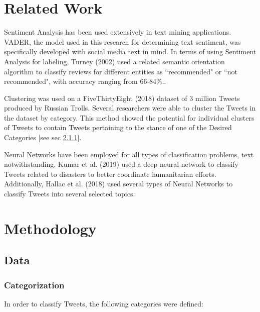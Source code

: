 \documentclass[12pt,letterpaper,oneside,titlepage]{article}
\begin{document}
\section{Related Work}\label{sec:related-work}

Sentiment Analysis has been used extensively in text mining applications. VADER, the model used in this 
research for determining text sentiment, was specifically developed with social media text in mind\cite{vader}. 
In terms of using Sentiment Analysis for labeling, Turney (2002) used a related semantic orientation algorithm to classify reviews for different entities as ``recommended" or ``not recommended", with accuracy ranging from 66-84\%.\cite{thumbs}.

Clustering was used on a FiveThirtyEight (2018) dataset of 3 million Tweets produced by Russian Trolls\cite{fte}. 
Several researchers were able to cluster the Tweets in the dataset by 
category. This method showed the potential for individual clusters of Tweets to contain Tweets 
pertaining to the stance of one of the Desired Categories [see sec \ref{subsubsec:categorization}].

Neural Networks have been employed for all types of classification problems, text notwithstanding. Kumar 
et al. (2019) used a deep neural network to classify Tweets related to disasters to better coordinate 
humanitarian efforts\cite{hum}. Additionally, Hallac et al. (2018) used several types of Neural Networks to classify 
Tweets into several selected topics\cite{hallac}.

\section{Methodology}\label{sec:methodology}

\subsection{Data}

\subsubsection{Categorization}\label{subsubsec:categorization}

In order to classify Tweets, the following categories were defined:
\end{document}
